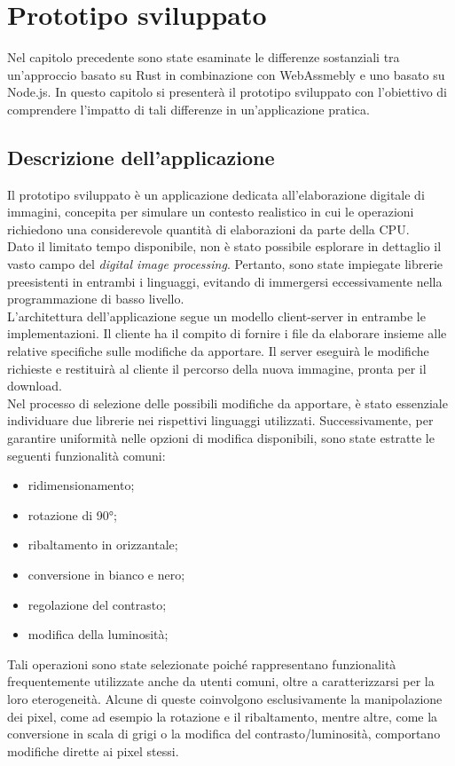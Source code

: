 \chapter{Prototipo sviluppato}
\label{chap:3}
Nel capitolo precedente sono state esaminate le differenze sostanziali tra un'approccio basato su Rust in combinazione con WebAssmebly e uno basato su Node.js.
In questo capitolo si presenterà il prototipo sviluppato con l'obiettivo di comprendere l'impatto di tali differenze in un'applicazione pratica.
\section{Descrizione dell'applicazione}
Il prototipo sviluppato è un applicazione dedicata all'elaborazione digitale di immagini, concepita per simulare un contesto realistico in cui le operazioni richiedono una considerevole quantità di elaborazioni da parte della CPU.
\\Dato il limitato tempo disponibile, non è stato possibile esplorare in dettaglio il vasto campo del \emph{digital image processing}. Pertanto, sono state impiegate librerie preesistenti in entrambi i linguaggi, evitando di immergersi eccessivamente nella programmazione di basso livello.
\\L'architettura dell'applicazione segue un modello client-server in entrambe le implementazioni.
Il cliente ha il compito di fornire i file da elaborare insieme alle relative specifiche sulle modifiche da apportare.
Il server eseguirà le modifiche richieste e restituirà al cliente il percorso della nuova immagine, pronta per il download.
\\Nel processo di selezione delle possibili modifiche da apportare, è stato essenziale individuare due librerie nei rispettivi linguaggi utilizzati.
Successivamente, per garantire uniformità nelle opzioni di modifica disponibili, sono state estratte le seguenti funzionalità comuni: 
\begin{itemize}
    \item ridimensionamento;
    \item rotazione di 90°;
    \item ribaltamento in orizzantale;
    \item conversione in bianco e nero;
    \item regolazione del contrasto;
    \item modifica della luminosità;
\end{itemize}
Tali operazioni sono state selezionate poiché rappresentano funzionalità frequentemente utilizzate anche da utenti comuni, oltre a caratterizzarsi per la loro eterogeneità. Alcune di queste coinvolgono esclusivamente la manipolazione dei pixel, come ad esempio la rotazione e il ribaltamento, mentre altre, come la conversione in scala di grigi o la modifica del contrasto/luminosità, comportano modifiche dirette ai pixel stessi.
\newpage

